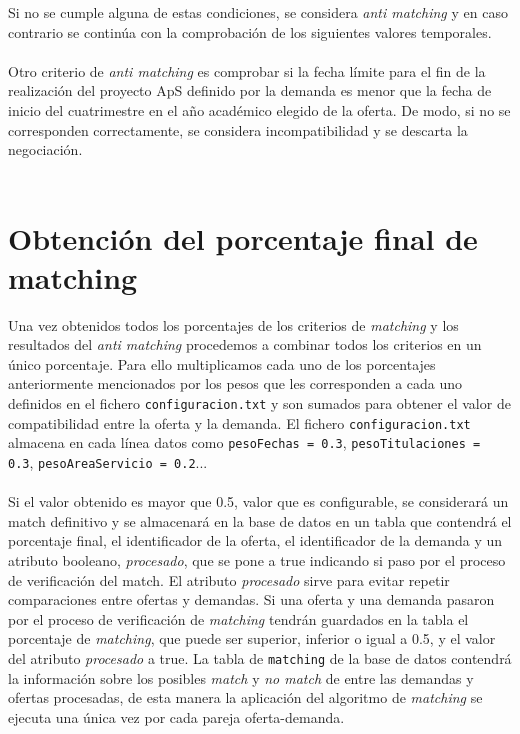 \documentclass[11pt]{book}
\begin{document}
 Si no se cumple alguna de estas condiciones, se considera \emph{anti matching} y en caso contrario se continúa con la comprobación de los siguientes valores temporales.\\\\
Otro criterio de \emph{anti matching} es comprobar si la fecha límite para el fin de la realización del proyecto ApS definido por la demanda es menor que la fecha de inicio del cuatrimestre en el año académico elegido de la oferta. De modo, si no se corresponden correctamente, se considera incompatibilidad y se descarta la negociación.\\\\
\section{Obtención del porcentaje final de matching}
Una vez obtenidos todos los porcentajes de los criterios de \emph{matching} y los resultados del \emph{anti matching} procedemos a combinar todos los criterios en un único porcentaje. Para ello multiplicamos cada uno de los porcentajes anteriormente mencionados por los pesos que les corresponden a cada uno definidos en el fichero \texttt{configuracion.txt} y son sumados para obtener el valor de compatibilidad entre la oferta y la demanda. El fichero \texttt{configuracion.txt} almacena en cada línea datos como \texttt{pesoFechas = 0.3}, \texttt{pesoTitulaciones = 0.3}, \texttt{pesoAreaServicio = 0.2}...  \\\\
Si el valor obtenido es mayor que 0.5, valor que es configurable, se considerará un match definitivo y se almacenará en la base de datos en un tabla que contendrá el porcentaje final, el identificador de la oferta, el identificador de la demanda y un atributo booleano, \emph{procesado}, que se pone a true indicando si paso por el proceso de verificación del match. 
El atributo \emph{procesado} sirve para evitar repetir comparaciones entre ofertas y demandas. Si una oferta y una demanda pasaron por el proceso de verificación de \emph{matching} tendrán guardados en la tabla el porcentaje de \emph{matching}, que puede ser superior, inferior o igual a 0.5, y el valor del atributo \emph{procesado} a true. La tabla de \texttt{matching} de la base de datos contendrá la información sobre los posibles \emph{match} y \emph{no match} de entre las demandas y ofertas procesadas, de esta manera la aplicación del algoritmo de \emph{matching} se ejecuta una única vez por cada pareja oferta-demanda. \\\\
\end{document}
